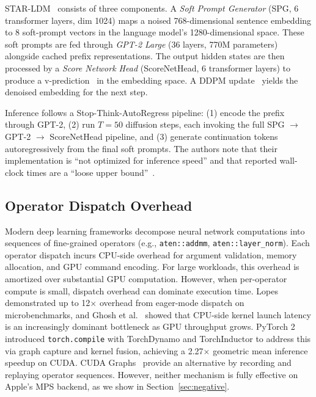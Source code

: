 \documentclass[sigconf,authordraft]{acmart}
\begin{document}
STAR-LDM~\cite{lovelace2025star} consists of three components. A \textit{Soft Prompt Generator} (SPG, 6 transformer layers, dim 1024) maps a noised 768-dimensional sentence embedding to 8 soft-prompt vectors in the language model's 1280-dimensional space. These soft prompts are fed through \textit{GPT-2 Large} (36 layers, 770M parameters) alongside cached prefix representations. The output hidden states are then processed by a \textit{Score Network Head} (ScoreNetHead, 6 transformer layers) to produce a v-prediction~\cite{salimans2022progressive} in the embedding space. A DDPM update~\cite{ho2020denoising} yields the denoised embedding for the next step.

Inference follows a Stop-Think-AutoRegress pipeline: (1) encode the prefix through GPT-2, (2) run $T=50$ diffusion steps, each invoking the full SPG $\to$ GPT-2 $\to$ ScoreNetHead pipeline, and (3) generate continuation tokens autoregressively from the final soft prompts. The authors note that their implementation is ``not optimized for inference speed'' and that reported wall-clock times are a ``loose upper bound''~\cite{lovelace2025star}.

\subsection{Operator Dispatch Overhead}

Modern deep learning frameworks decompose neural network computations into sequences of fine-grained operators (e.g., \texttt{aten::addmm}, \texttt{aten::layer\_norm}). Each operator dispatch incurs CPU-side overhead for argument validation, memory allocation, and GPU command encoding. For large workloads, this overhead is amortized over substantial GPU computation. However, when per-operator compute is small, dispatch overhead can dominate execution time. Lopes~\cite{lopes2023torchy} demonstrated up to 12$\times$ overhead from eager-mode dispatch on microbenchmarks, and Ghosh et al.~\cite{ghosh2025pygraph} showed that CPU-side kernel launch latency is an increasingly dominant bottleneck as GPU throughput grows. PyTorch 2~\cite{ansel2024pytorch2} introduced \texttt{torch.compile} with TorchDynamo and TorchInductor to address this via graph capture and kernel fusion, achieving a 2.27$\times$ geometric mean inference speedup on CUDA. CUDA Graphs~\cite{nvidia2020cudagraphs} provide an alternative by recording and replaying operator sequences. However, neither mechanism is fully effective on Apple's MPS backend, as we show in Section~\ref{sec:negative}.
\end{document}

